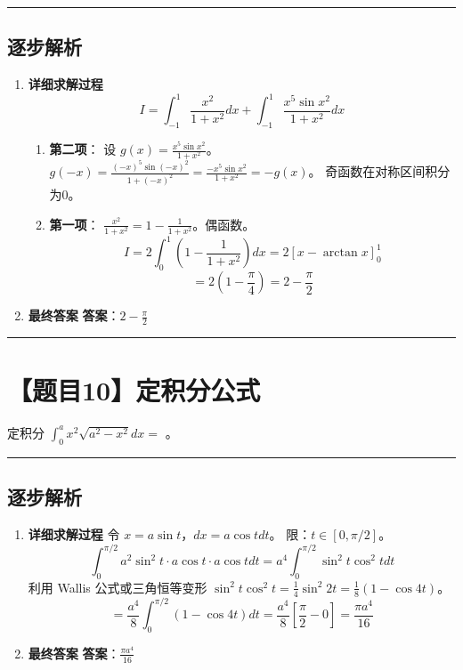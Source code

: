 \documentclass[UTF8]{ctexart}
\newenvironment{redenv}{\color{red}}{}
\newenvironment{detailedanalysis}{%
    \color{red}
    \begin{enumerate}[label=\textbf{第\arabic*步：}, leftmargin=*, align=left, itemsep=1.5ex]
}{%
    \end{enumerate}
}
\newcommand{\problemrule}{\noindent\rule{\textwidth}{1.5pt}\vspace{-0.8em}}
\newcommand{\analysisrule}{\noindent\rule{\textwidth}{0.8pt}\vspace{-0.8em}}
\newcommand{\blank}[1]{\underline{\hspace{#1}}}
\begin{document}
\begin{redenv}
\analysisrule
\subsection*{逐步解析}

\begin{detailedanalysis}
\item \textbf{详细求解过程}
$$ I = \int_{-1}^1 \frac{x^2}{1+x^2} dx + \int_{-1}^1 \frac{x^5 \sin x^2}{1+x^2} dx $$
\begin{enumerate}[label=(\arabic*)]
\item \textbf{第二项}：
设 $g(x) = \frac{x^5 \sin x^2}{1+x^2}$。
$g(-x) = \frac{(-x)^5 \sin(-x)^2}{1+(-x)^2} = \frac{-x^5 \sin x^2}{1+x^2} = -g(x)$。
奇函数在对称区间积分为0。
\item \textbf{第一项}：
$\frac{x^2}{1+x^2} = 1 - \frac{1}{1+x^2}$。偶函数。
$$ I = 2 \int_0^1 (1 - \frac{1}{1+x^2}) dx = 2 [x - \arctan x]_0^1 $$
$$ = 2 (1 - \frac{\pi}{4}) = 2 - \frac{\pi}{2} $$
\end{enumerate}

\item \textbf{最终答案}
\textbf{答案}：$ 2 - \frac{\pi}{2} $
\end{detailedanalysis}
\end{redenv}

\problemrule
\section*{【题目10】定积分公式}
定积分 $ \int_{0}^{a}x^{2}\sqrt{a^{2}-x^{2}}dx= $ \blank{2cm}。

\begin{redenv}
\analysisrule
\subsection*{逐步解析}

\begin{detailedanalysis}
\item \textbf{详细求解过程}
令 $x = a\sin t$，$dx = a\cos t dt$。
限：$t \in [0, \pi/2]$。
$$ \int_0^{\pi/2} a^2\sin^2 t \cdot a\cos t \cdot a\cos t dt = a^4 \int_0^{\pi/2} \sin^2 t \cos^2 t dt $$
利用 Wallis 公式或三角恒等变形 $\sin^2 t \cos^2 t = \frac{1}{4} \sin^2 2t = \frac{1}{8}(1-\cos 4t)$。
$$ = \frac{a^4}{8} \int_0^{\pi/2} (1-\cos 4t) dt = \frac{a^4}{8} [\frac{\pi}{2} - 0] = \frac{\pi a^4}{16} $$

\item \textbf{最终答案}
\textbf{答案}：$ \frac{\pi a^4}{16} $
\end{detailedanalysis}
\end{redenv}
\end{document}
